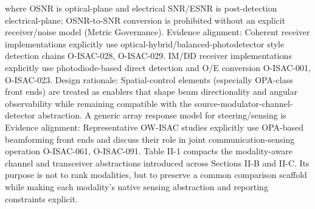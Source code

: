 {}where OSNR is optical-plane and electrical SNR/ESNR is post-detection electrical-plane; OSNR-to-SNR conversion is prohibited without an explicit receiver/noise model (Metric Governance).\markdownRendererParagraphSeparator
{}Evidence alignment: Coherent receiver implementations explicitly use optical-hybrid/balanced-photodetector style detection chains O-ISAC-028, O-ISAC-029. IM/DD receiver implementations explicitly use photodiode-based direct detection and O/E conversion O-ISAC-001, O-ISAC-023.\markdownRendererInterblockSeparator
{}
\markdownRendererSectionEnd \markdownRendererSectionBegin
{}\markdownRendererInterblockSeparator
{}Design rationale: Spatial-control elements (especially OPA-class front ends) are treated as enablers that shape beam directionality and angular observability while remaining compatible with the source-modulator-channel-detector abstraction.\markdownRendererParagraphSeparator
{}A generic array response model for steering/sensing is\markdownRendererSoftLineBreak
{}\markdownRendererParagraphSeparator
{}Evidence alignment: Representative OW-ISAC studies explicitly use OPA-based beamforming front ends and discuss their role in joint communication-sensing operation O-ISAC-061, O-ISAC-091.\markdownRendererParagraphSeparator
{}Table II-1 compacts the modality-aware channel and transceiver abstractions introduced across Sections II-B and II-C. Its purpose is not to rank modalities, but to preserve a common comparison scaffold while making each modality's native sensing abstraction and reporting constraints explicit.\markdownRendererParagraphSeparator
{}\markdownRendererInterblockSeparator
